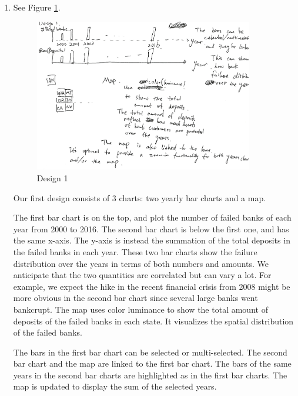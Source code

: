 \documentclass[11pt]{article}
\begin{document}
\begin{enumerate}
    \item See Figure \ref{fig:design_1}.

        \begin{figure}[!h]
            \centering
            \includegraphics[width=0.9\textwidth]{fig/design_1}
            \caption{Design 1}
            \label{fig:design_1}
        \end{figure}

        Our first design consists of 3 charts: two yearly bar charts and a
        map. 
        
        The first bar chart is on the top, and plot the number of failed banks
        of each year from 2000 to 2016. The second bar chart is below the
        first one, and has the same x-axis. The y-axis is instead the
        summation of the total deposits in the failed banks in each year.
        These two bar charts show the failure distribution over the years in
        terms of both numbers and amounts. We anticipate that the two
        quantities are correlated but can vary a lot. For example, we expect
        the hike in the recent financial crisis from 2008 might be more
        obvious in the second bar chart since several large banks went
        bankcrupt.  The map uses color luminance to show the total amount of
        deposits of the failed banks in each state. It visualizes the spatial
        distribution of the failed banks.

        The bars in the first bar chart can be selected or multi-selected. The
        second bar chart and the map are linked to the first bar chart. The
        bars of the same years in the second bar charts are highlighted as in the
        first bar charts. The map is updated to display the sum of the selected years.


\end{enumerate}
\end{document}
